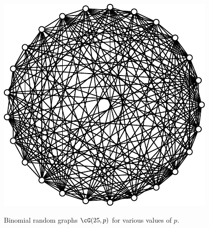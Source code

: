 \begin{figure}[!htbp]
{    \includegraphics{image/random-graphs/binomial-random-graphs-25-nodes_e}
}
\qquad
{}
\caption{Binomial random graphs $\cG(25,p)$ for various values of $p$.}
\label{fig:random_graphs:binomial_random_graph_25_nodes}
\end{figure}

